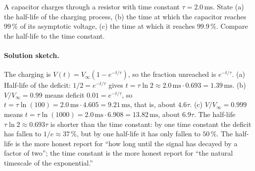 \begin{exercise}
A capacitor charges through a resistor with time constant $\tau =
2.0 \,\si{\milli\second}$. State (a) the half-life of the charging
process, (b) the time at which the capacitor reaches $99\,\%$ of its
asymptotic voltage, (c) the time at which it reaches $99.9\,\%$.
Compare the half-life to the time constant.

\paragraph{Solution sketch.}
The charging is $V(t) = V_{\infty}(1 - e^{-t/\tau})$, so the
fraction unreached is $e^{-t/\tau}$.
(a) Half-life of the deficit: $1/2 = e^{-t/\tau}$ gives $t = \tau
\ln 2 \approx 2.0 \,\si{\milli\second} \cdot 0.693 = 1.39 \,\si
{\milli\second}$.
(b) $V/V_{\infty} = 0.99$ means deficit $0.01 = e^{-t/\tau}$, so
$t = \tau \ln(100) = 2.0 \,\si{\milli\second} \cdot 4.605 = 9.21 \,
\si{\milli\second}$, that is, about $4.6 \tau$.
(c) $V/V_{\infty} = 0.999$ means $t = \tau \ln(1000) = 2.0 \,\si
{\milli\second} \cdot 6.908 = 13.82 \,\si{\milli\second}$, about
$6.9 \tau$.
The half-life $\tau \ln 2 \approx 0.693 \tau$ is shorter than the
time constant: by one time constant the deficit has fallen to
$1/e \approx 37\,\%$, but by one half-life it has only fallen to
$50\,\%$. The half-life is the more honest report for ``how long
until the signal has decayed by a factor of two''; the time
constant is the more honest report for ``the natural timescale of
the exponential.''
\end{exercise}

